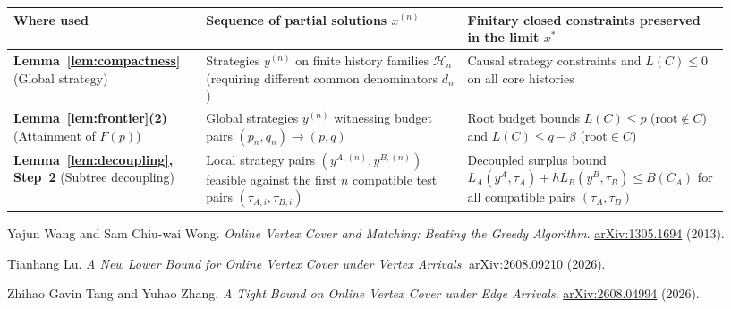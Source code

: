 \documentclass[11pt,letterpaper]{article}
\begin{document}
\begin{center}
\small\renewcommand{\arraystretch}{1.28}
\begin{tabular}{@{}>{\raggedright\arraybackslash}p{0.25\linewidth}>{\raggedright\arraybackslash}p{0.34\linewidth}>{\raggedright\arraybackslash}p{0.34\linewidth}@{}}
\hline
\textbf{Where used} & \textbf{Sequence of partial solutions $x^{(n)}$} & \textbf{Finitary closed constraints preserved in the limit $x^*$} \\
\hline
\textbf{Lemma~\ref{lem:compactness}} (Global strategy) & Strategies $y^{(n)}$ on finite history families $\mathcal H_n$ (requiring different common denominators $d_n$) & Causal strategy constraints and $L(C)\le 0$ on all core histories \\
\textbf{Lemma~\ref{lem:frontier}(2)} (Attainment of $F(p)$) & Global strategies $y^{(n)}$ witnessing budget pairs $(p_n,q_n)\to (p,q)$ & Root budget bounds $L(C)\le p$ ($\text{root}\notin C$) and $L(C)\le q-\beta$ ($\text{root}\in C$) \\
\textbf{Lemma~\ref{lem:decoupling}, Step~2} (Subtree decoupling) & Local strategy pairs $(y^{A,(n)},y^{B,(n)})$ feasible against the first $n$ compatible test pairs $(\tau_{A,i},\tau_{B,i})$ & Decoupled surplus bound $L_A(y^A,\tau_A)+h L_B(y^B,\tau_B)\le B(C_A)$ for all compatible pairs $(\tau_A,\tau_B)$ \\
\hline
\end{tabular}
\end{center}

\begin{thebibliography}{9}
 Yajun Wang and Sam Chiu-wai Wong.
\emph{Online Vertex Cover and Matching: Beating the Greedy Algorithm}.
\href{https://arxiv.org/abs/1305.1694}{arXiv:1305.1694} (2013).

 Tianhang Lu.
\emph{A New Lower Bound for Online Vertex Cover under Vertex Arrivals}.
\href{https://arxiv.org/abs/2608.09210}{arXiv:2608.09210} (2026).

 Zhihao Gavin Tang and Yuhao Zhang.
\emph{A Tight Bound on Online Vertex Cover under Edge Arrivals}.
\href{https://arxiv.org/abs/2608.04994}{arXiv:2608.04994} (2026).
\end{thebibliography}
\end{document}
